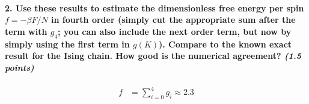 \paragraph{2. Use these results to estimate 
    the dimensionless free energy per spin 
    $f=-\beta F/N$ in fourth order (simply cut 
    the appropriate sum after the term with 
    $g_4$; you can also include the next order
    term, but now by simply using the first 
    term in $g(K)$). Compare to the known 
    exact result for the Ising chain. How good
    is the numerical agreement?
    \textit{(1.5 points)}
}
    \begin{align}
        f
        &=\sum_{i=0}^{4}g_i
        \approx2.3
    \end{align}
